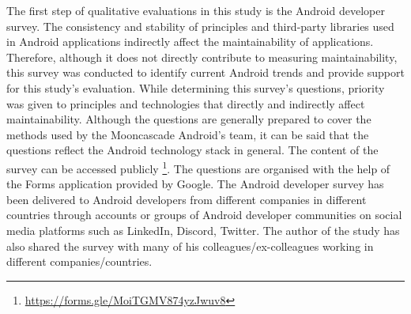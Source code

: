 The first step of qualitative evaluations in this study is the Android developer survey. The consistency and stability of principles and third-party libraries used in Android applications indirectly affect the maintainability of applications. Therefore, although it does not directly contribute to measuring maintainability, this survey was conducted to identify current Android trends and provide support for this study's evaluation. While determining this survey's questions, priority was given to principles and technologies that directly and indirectly affect maintainability. Although the questions are generally prepared to cover the methods used by the Mooncascade Android's team, it can be said that the questions reflect the Android technology stack in general. The content of the survey can be accessed publicly \footnote{\url{https://forms.gle/MoiTGMV874yzJwuv8}}. The questions are organised with the help of the Forms application provided by Google. The Android developer survey has been delivered to Android developers from different companies in different countries through accounts or groups of Android developer communities on social media platforms such as LinkedIn, Discord, Twitter. The author of the study has also shared the survey with many of his colleagues/ex-colleagues working in different companies/countries.